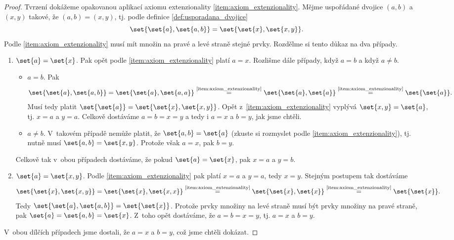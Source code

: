 \begin{proof}
    Tvrzení dokážeme opakovanou aplikací axiomu extenzionality \ref{item:axiom_extenzionality}. Mějme uspořádané dvojice $(a,b)$ a $(x,y)$ takové, že $(a,b)=(x,y)$, tj. podle definice \ref{def:usporadana_dvojice}
    \begin{equation*}
        \set{\set{a},\set{a,b}}=\set{\set{x},\set{x,y}}.
    \end{equation*}
    Podle \ref{item:axiom_extenzionality} musí mít množin na pravé a levé straně stejné prvky. Rozdělme si tento důkaz na dva případy.
    \begin{enumerate}[label=(\alph*)]
        \item $\set{a}=\set{x}$. Pak opět podle \ref{item:axiom_extenzionality} platí $a=x$. Rozlišme dále případy, když $a=b$ a když $a\neq b$.
        \begin{itemize}
            \item $a=b$. Pak
            \begin{equation*}
                \set{\set{a},\set{a,b}}=\set{\set{a},\set{a,a}}\stackrel{\text{\ref{item:axiom_extenzionality}}}{=}\set{\set{a},\set{a}}\stackrel{\text{\ref{item:axiom_extenzionality}}}{=}\set{\set{a}}.
            \end{equation*}
            Musí tedy platit $\set{\set{a}}=\set{\set{x},\set{x,y}}$. Opět z~\ref{item:axiom_extenzionality} vyplývá $\set{x,y}=\set{a}$, tj. $x=a$ a $y=a$. Celkově dostáváme $a=b=x=y$ a tedy i $a=x$ a $b=y$, jak jsme chtěli.
            \item $a\neq b$. V~takovém případě nemůže platit, že $\set{a,b}=\set{a}$ (zkuste si rozmyslet podle \ref{item:axiom_extenzionality}), tj. nutně musí $\set{a,b}=\set{x,y}$. Protože však $a=x$, pak $b=y$.
        \end{itemize}
        Celkově tak v~obou případech dostáváme, že pokud $\set{a}=\set{x}$, pak $x=a$ a $y=b$.
        \item $\set{a}=\set{x,y}$. Podle \ref{item:axiom_extenzionality} pak platí $x=a$ a $y=a$, tedy $x=y$. Stejným postupem tak dostáváme
        \begin{equation*}
            \set{\set{x},\set{x,y}}=\set{\set{x},\set{x,x}}\stackrel{\text{\ref{item:axiom_extenzionality}}}{=}\set{\set{x},\set{x}}\stackrel{\text{\ref{item:axiom_extenzionality}}}{=}\set{\set{x}}.
        \end{equation*}
        Tedy $\set{\set{a},\set{a,b}}=\set{\set{x}}$. Protože prvky množiny na levé straně musí být prvky množiny na pravé straně, pak $\set{a}=\set{a,b}=\set{x}$. Z~toho opět dostáváme, že $a=b=x=y$, tj. $a=x$ a $b=y$.
    \end{enumerate}
    V~obou dílčích případech jsme dostali, že $a=x$ a $b=y$, což jsme chtěli dokázat.
\end{proof}